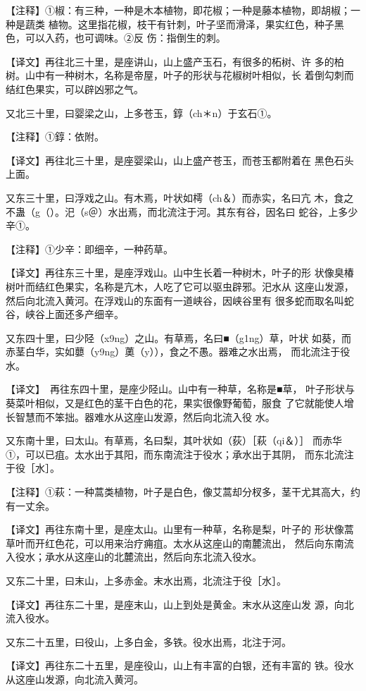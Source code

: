 \documentclass[a4paper,12pt,UTF8,twoside]{ctexbook}
\begin{document}
【注释】①椒：有三种，一种是木本植物，即花椒；一种是藤本植物，即胡椒；一种是蔬类 植物。这里指花椒，枝干有针刺，叶子坚而滑泽，果实红色，种子黑色，可以入药，也可调味。②反 伤：指倒生的刺。

【译文】再往北三十里，是座讲山，山上盛产玉石，有很多的柘树、许 多的柏树。山中有一种树木，名称是帝屋，叶子的形状与花椒树叶相似，长 着倒勾刺而结红色果实，可以辟凶邪之气。

又北三十里，曰婴梁之山，上多苍玉，錞（ch＊n）于玄石①。

【注释】①錞：依附。

【译文】再往北三十里，是座婴梁山，山上盛产苍玉，而苍玉都附着在 黑色石头上面。

又东三十里，曰浮戏之山。有木焉，叶状如樗（ch＆）而赤实，名曰亢 木，食之不蛊（g（）。汜（s＠）水出焉，而北流注于河。其东有谷，因名曰 蛇谷，上多少辛①。

【注释】①少辛：即细辛，一种药草。

【译文】再往东三十里，是座浮戏山。山中生长着一种树木，叶子的形 状像臭椿树叶而结红色果实，名称是亢木，人吃了它可以驱虫辟邪。汜水从 这座山发源，然后向北流入黄河。在浮戏山的东面有一道峡谷，因峡谷里有 很多蛇而取名叫蛇谷，峡谷上面还多产细辛。

又东四十里，曰少陉（x9ng）之山。有草焉，名曰■（g1ng）草，叶状 如葵，而赤茎白华，实如蘡（y9ng）薁（y）），食之不愚。器难之水出焉， 而北流注于役水。

【译文】　再往东四十里，是座少陉山。山中有一种草，名称是■草， 叶子形状与葵菜叶相似，又是红色的茎干白色的花，果实很像野葡萄，服食 了它就能使人增长智慧而不笨拙。器难水从这座山发源，然后向北流入役 水。

又东南十里，曰太山。有草焉，名曰梨，其叶状如（荻）［萩（qi＆）］ 而赤华①，可以已疽。太水出于其阳，而东南流注于役水；承水出于其阴， 而东北流注于役［水］。

【注释】①萩：一种蒿类植物，叶子是白色，像艾蒿却分杈多，茎干尤其高大，约有一丈余。

【译文】再往东南十里，是座太山。山里有一种草，名称是梨，叶子的 形状像蒿草叶而开红色花，可以用来治疗痈疽。太水从这座山的南麓流出， 然后向东南流入役水；承水从这座山的北麓流出，然后向东北流入役水。

又东二十里，曰末山，上多赤金。末水出焉，北流注于役［水］。

【译文】再往东二十里，是座末山，山上到处是黄金。末水从这座山发 源，向北流入役水。

又东二十五里，曰役山，上多白金，多铁。役水出焉，北注于河。

【译文】再往东二十五里，是座役山，山上有丰富的白银，还有丰富的 铁。役水从这座山发源，向北流入黄河。
\end{document}
